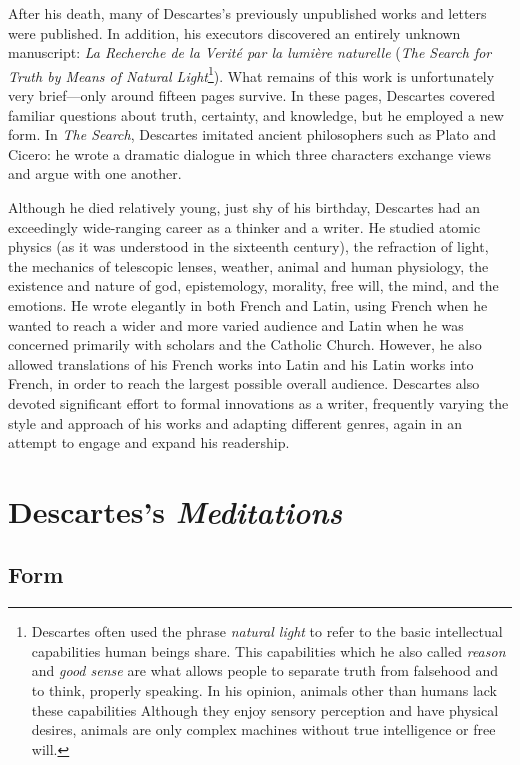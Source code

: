 After his death, many of Descartes's previously unpublished works and letters were published. In addition, his executors discovered an entirely unknown manuscript: \textit{La Recherche de la Verité par la lumière naturelle} (\textit{The Search for Truth by Means of Natural Light}\footnote{Descartes often used the phrase \textit{natural light} to refer to the basic intellectual capabilities human beings share. This capabilities which he also called \textit{reason} and \textit{good sense} are what allows people to separate truth from falsehood and to think, properly speaking. In his opinion, animals other than humans lack these capabilities Although they enjoy sensory perception and have physical desires, animals are only complex machines without true intelligence or free will.}). What remains of this work is unfortunately very brief---only around fifteen pages survive. In these pages, Descartes covered familiar questions about truth, certainty, and knowledge, but he employed a new form. In \textit{The Search}, Descartes imitated ancient philosophers such as Plato and Cicero: he wrote a dramatic dialogue in which three characters exchange views and argue with one another.

Although he died relatively young, just shy of his  birthday, Descartes had an exceedingly wide-ranging career as a thinker and a writer. He studied atomic physics (as it was understood in the sixteenth century), the refraction of light, the mechanics of telescopic lenses, weather, animal and human physiology, the existence and nature of god, epistemology, morality, free will, the mind, and the emotions. He wrote elegantly in both French and Latin, using French when he wanted to reach a wider and more varied audience and Latin when he was concerned primarily with scholars and the Catholic Church. However, he also allowed translations of his French works into Latin and his Latin works into French, in order to reach the largest possible overall audience. Descartes also devoted significant effort to formal innovations as a writer, frequently varying the style and approach of his works and adapting different genres, again in an attempt to engage and expand his readership.

\section{Descartes's \textit{Meditations}}

\subsection*{Form}

